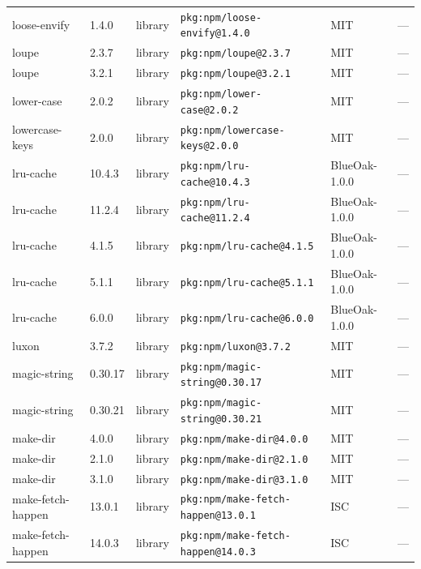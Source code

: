\documentclass[11pt,a4paper]{article}
\begin{document}
\begin{longtable}{|p{4cm}|p{2cm}|p{1.6cm}|p{5cm}|p{1.5cm}|p{3.5cm}|}
\raggedright loose-envify & 1.4.0 & library & \small\texttt{pkg:npm/loose-envify@1.4.0} & MIT & \small — \\
\raggedright loupe & 2.3.7 & library & \small\texttt{pkg:npm/loupe@2.3.7} & MIT & \small — \\
\raggedright loupe & 3.2.1 & library & \small\texttt{pkg:npm/loupe@3.2.1} & MIT & \small — \\
\raggedright lower-case & 2.0.2 & library & \small\texttt{pkg:npm/lower-case@2.0.2} & MIT & \small — \\
\raggedright lowercase-keys & 2.0.0 & library & \small\texttt{pkg:npm/lowercase-keys@2.0.0} & MIT & \small — \\
\raggedright lru-cache & 10.4.3 & library & \small\texttt{pkg:npm/lru-cache@10.4.3} & BlueOak-1.0.0 & \small — \\
\raggedright lru-cache & 11.2.4 & library & \small\texttt{pkg:npm/lru-cache@11.2.4} & BlueOak-1.0.0 & \small — \\
\raggedright lru-cache & 4.1.5 & library & \small\texttt{pkg:npm/lru-cache@4.1.5} & BlueOak-1.0.0 & \small — \\
\raggedright lru-cache & 5.1.1 & library & \small\texttt{pkg:npm/lru-cache@5.1.1} & BlueOak-1.0.0 & \small — \\
\raggedright lru-cache & 6.0.0 & library & \small\texttt{pkg:npm/lru-cache@6.0.0} & BlueOak-1.0.0 & \small — \\
\raggedright luxon & 3.7.2 & library & \small\texttt{pkg:npm/luxon@3.7.2} & MIT & \small — \\
\raggedright magic-string & 0.30.17 & library & \small\texttt{pkg:npm/magic-string@0.30.17} & MIT & \small — \\
\raggedright magic-string & 0.30.21 & library & \small\texttt{pkg:npm/magic-string@0.30.21} & MIT & \small — \\
\raggedright make-dir & 4.0.0 & library & \small\texttt{pkg:npm/make-dir@4.0.0} & MIT & \small — \\
\raggedright make-dir & 2.1.0 & library & \small\texttt{pkg:npm/make-dir@2.1.0} & MIT & \small — \\
\raggedright make-dir & 3.1.0 & library & \small\texttt{pkg:npm/make-dir@3.1.0} & MIT & \small — \\
\raggedright make-fetch-happen & 13.0.1 & library & \small\texttt{pkg:npm/make-fetch-happen@13.0.1} & ISC & \small — \\
\raggedright make-fetch-happen & 14.0.3 & library & \small\texttt{pkg:npm/make-fetch-happen@14.0.3} & ISC & \small — \\

\end{longtable}
\end{document}
